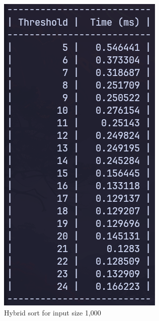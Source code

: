 \begin{figure}[H]
    \centering
    \begin{subfigure}[t]{0.4\textwidth}
        \centering
        \includegraphics[scale=0.4]{img/task4/hi-1000.png}
        \caption{Hybrid sort for input size 1,000}
    \end{subfigure}
    \hfill
    \begin{subfigure}[t]{0.4\textwidth}
        \centering

\end{subfigure}
\end{figure}
